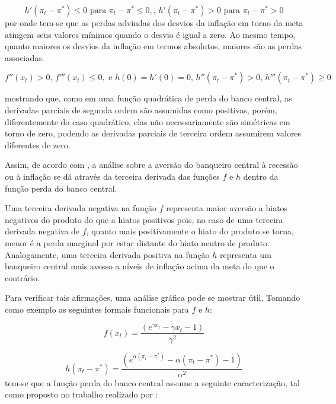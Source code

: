 \documentclass[
	article,			%
	11pt,				%
	oneside,			%
	a4paper,			%
	english,			%
	brazil,				%
	]{abntex2}
\begin{document}
	\begin{equation}
		h'(\pi_t-\pi^*) \leq 0 \mbox{ para } \pi_t - \pi^* \leq 0, \nonumber \mbox{, } h'(\pi_t-\pi^*) > 0 \mbox{ para } \pi_t - \pi^* > 0 
	\end{equation}
	por onde tem-se que as perdas advindas dos desvios da inflação em torno da meta atingem seus valores mínimos quando o desvio é igual a zero. Ao mesmo tempo, quanto maiores os desvios da inflação em termos absolutos, maiores são as perdas associadas.
	
	\begin{equation}
		f''(x_t)>0 \mbox{, } f'''(x_t) \leq 0,\nonumber \mbox{ e }   h(0)=h'(0)=0 \mbox{, } h''(\pi_t-\pi^*)>0 \mbox{, } h'''(\pi_t-\pi^*) \geq 0
	\end{equation}
	
	mostrando que, como em uma função quadrática de perda do banco central, as derivadas parciais de segunda ordem são assumidas como positivas, porém, diferentemente do caso quadrático, elas não necessariamente são simétricas em torno de zero, podendo as derivadas parciais de terceira ordem assumirem valores diferentes de zero.
	
	Assim, de acordo com , a análise sobre a aversão do banqueiro central à recessão ou à inflação se dá através da terceira derivada das funções $f$ e $h$ dentro da função perda do banco central. 
	
	Uma terceira derivada negativa na função $f$ representa maior aversão a hiatos negativos do produto do que a hiatos positivos pois, no caso de uma terceira derivada negativa de $f$, quanto mais positivamente o hiato do produto se torna, menor é a perda marginal por estar distante do hiato neutro de produto. Analogamente, uma terceira derivada positiva na função $h$ representa um banqueiro central mais avesso a níveis de inflação acima da meta do que o contrário.	
	
	Para verificar tais afirmações, uma análise gráfica pode se mostrar útil. Tomando como exemplo as seguintes formais funcionais para $f$ e $h$:
	
	\begin{equation}
		f(x_t) = \frac{(e^{\gamma x_t} - \gamma x_t - 1)}{\gamma^2} 
	\end{equation}
	
	\begin{equation}	
		h(\pi_t - \pi^*) = \frac{(e^{\alpha (\pi_t - \pi^*)} - \alpha (\pi_t - \pi^*) - 1)}{\alpha^2}
	\end{equation}
%
	tem-se que a função perda do banco central assume a seguinte caracterização, tal como proposto no trabalho realizado por :
	
\end{document}
